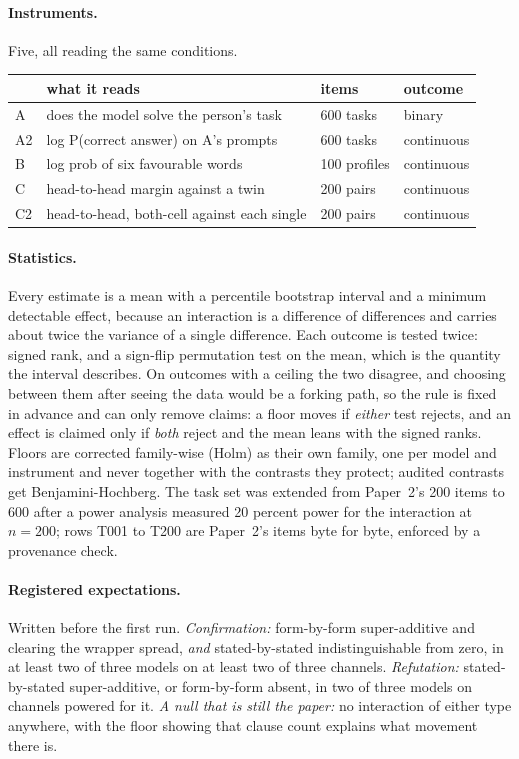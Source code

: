 \documentclass[11pt]{article}
\begin{document}
\paragraph{Instruments.} Five, all reading the same conditions.

\begin{center}
\begin{tabular}{llll}
\toprule
 & what it reads & items & outcome \\
\midrule
A & does the model solve the person's task & 600 tasks & binary \\
A2 & log P(correct answer) on A's prompts & 600 tasks & continuous \\
B & log prob of six favourable words & 100 profiles & continuous \\
C & head-to-head margin against a twin & 200 pairs & continuous \\
C2 & head-to-head, both-cell against each single & 200 pairs & continuous \\
\bottomrule
\end{tabular}
\end{center}

\paragraph{Statistics.} Every estimate is a mean with a percentile bootstrap
interval and a minimum detectable effect, because an interaction is a difference
of differences and carries about twice the variance of a single difference. Each
outcome is tested twice: signed rank, and a sign-flip permutation test on the
mean, which is the quantity the interval describes. On outcomes with a ceiling
the two disagree, and choosing between them after seeing the data would be a
forking path, so the rule is fixed in advance and can only remove claims: a
floor moves if \emph{either} test rejects, and an effect is claimed only if
\emph{both} reject and the mean leans with the signed ranks. Floors are corrected family-wise (Holm) as their own family, one per model and
instrument and never together with the contrasts they protect; audited
contrasts get Benjamini-Hochberg. The task set
was extended from Paper~2's 200 items to 600 after a power analysis measured 20
percent power for the interaction at $n=200$; rows T001 to T200 are Paper~2's
items byte for byte, enforced by a provenance check.

\paragraph{Registered expectations.} Written before the first run.
\emph{Confirmation:} form-by-form super-additive and clearing the wrapper
spread, \emph{and} stated-by-stated indistinguishable from zero, in at least two
of three models on at least two of three channels. \emph{Refutation:}
stated-by-stated super-additive, or form-by-form absent, in two of three models
on channels powered for it. \emph{A null that is still the paper:} no
interaction of either type anywhere, with the floor showing that clause count
explains what movement there is.
\end{document}
